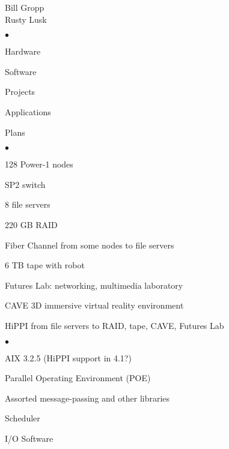 
\newenvironment{mainpts}{\begin{list}{$\bullet$}{\setlength{\leftmargin}{.30in}}}{\end{list}}
\newenvironment{secpts}{\begin{list}{--}{\setlength{\leftmargin}{.35in}}}{\end{list}}

\newif\ifpictures
\picturesfalse

\begin{center}
\logo
Bill Gropp \\
Rusty Lusk\\[1.5in]
\end{center}
\vfill
\ve

  \begin{mainpts}
    \item Hardware
    \item Software
    \item Projects
    \item Applications
    \item Plans
  \end{mainpts}
\ve

\begin{small}
\begin{mainpts}
  \item 128 Power-1 nodes
  \item SP2 switch
  \item 8 file servers
  \item 220 GB RAID
  \item Fiber Channel from some nodes to file servers
  \item 6 TB tape with robot
  \item Futures Lab:  networking, multimedia laboratory
  \item CAVE 3D immersive virtual reality environment
  \item HiPPI from file servers to RAID, tape, CAVE, Futures Lab
\end{mainpts}
\end{small}
\ve

\begin{small}
\centerline{\epsfxsize=5in}
\end{small}
\ve

\begin{small}
\begin{mainpts}
  \item AIX 3.2.5  (HiPPI support in 4.1?)
  \item Parallel Operating Environment (POE)
  \item Assorted message-passing and other libraries
  \item Scheduler
  \item I/O Software
\end{mainpts}
\end{small}
\ve

